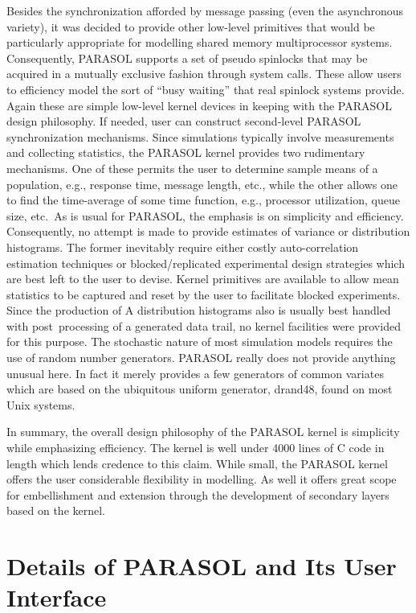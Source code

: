 \documentclass[11pt]{article}
\begin{document}
Besides the synchronization afforded by message passing (even the asynchronous variety), it was
decided to provide other low-level primitives that would be particularly appropriate for modelling
shared memory multiprocessor systems.  Consequently, PARASOL supports a set of pseudo
spinlocks that may be acquired in a mutually exclusive fashion through system calls. These allow
users to efficiency model the sort of ``busy waiting'' that real spinlock systems provide. Again
these are simple low-level kernel devices in keeping with the PARASOL design philosophy. If
needed, user can construct second-level PARASOL synchronization mechanisms.
Since simulations typically involve measurements and collecting statistics, the PARASOL kernel
provides two rudimentary mechanisms. One of these permits the user to determine sample means
of a population, e.g., response time, message length, etc., while the other allows one to find the
time-average of some time function, e.g., processor utilization, queue size, etc.\ As is usual for
PARASOL, the emphasis is on simplicity and efficiency. Consequently, no attempt is made to
provide estimates of variance or distribution histograms. The former inevitably require either
costly auto-correlation estimation techniques or blocked/replicated experimental design strategies
which are best left to the user to devise. Kernel primitives are available to allow mean statistics to
be captured and reset by the user to facilitate blocked experiments. Since the production of
A distribution histograms also is usually best handled with post~processing of a generated data trail,
no kernel facilities were provided for this purpose. The stochastic nature of most simulation
models requires the use of random number generators. PARASOL really does not provide
anything unusual here. In fact it merely provides a few generators of common variates which are
based on the ubiquitous uniform generator, drand48, found on most Unix systems.

In summary, the overall design philosophy of the PARASOL kernel is simplicity while
emphasizing efficiency. The kernel is well under 4000 lines of C code in length which lends
credence to this claim. While small, the PARASOL kernel offers the user considerable flexibility
in modelling. As well it offers great scope for embellishment and extension through the
development of secondary layers based on the kernel.

\section{Details of PARASOL and Its User Interface}
\label{sec:details}
\end{document}
